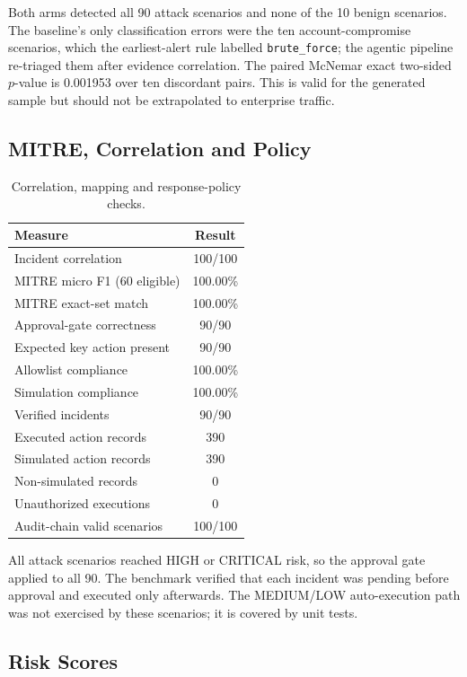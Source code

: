 \documentclass[10pt,twocolumn]{article}
\begin{document}
Both arms detected all 90 attack scenarios and none of the 10 benign scenarios. The baseline's only classification errors were the ten account-compromise scenarios, which the earliest-alert rule labelled \texttt{brute\_force}; the agentic pipeline re-triaged them after evidence correlation. The paired McNemar exact two-sided $p$-value is 0.001953 over ten discordant pairs. This is valid for the generated sample but should not be extrapolated to enterprise traffic.

\subsection{MITRE, Correlation and Policy}

\begin{table}[h]
\centering
\small
\caption{Correlation, mapping and response-policy checks.}
\label{tab:policy}
\begin{tabular}{lc}
\toprule
Measure & Result \\
\midrule
Incident correlation & 100/100 \\
MITRE micro F1 (60 eligible) & 100.00\% \\
MITRE exact-set match & 100.00\% \\
Approval-gate correctness & 90/90 \\
Expected key action present & 90/90 \\
Allowlist compliance & 100.00\% \\
Simulation compliance & 100.00\% \\
Verified incidents & 90/90 \\
Executed action records & 390 \\
Simulated action records & 390 \\
Non-simulated records & 0 \\
Unauthorized executions & 0 \\
Audit-chain valid scenarios & 100/100 \\
\bottomrule
\end{tabular}
\end{table}

All attack scenarios reached HIGH or CRITICAL risk, so the approval gate applied to all 90. The benchmark verified that each incident was pending before approval and executed only afterwards. The MEDIUM/LOW auto-execution path was not exercised by these scenarios; it is covered by unit tests.

\subsection{Risk Scores}
\end{document}
